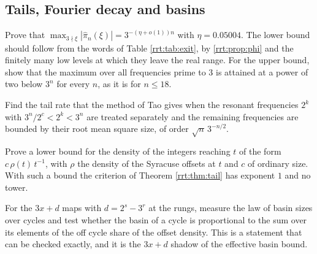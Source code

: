 \subsection{Tails, Fourier decay and basins}
\begin{problem*}[R11. B2 restated]\label{rrt:prob:r11}
Prove that $\max_{3\nmid\xi}|\widehat\pi_n(\xi)|=3^{-(\eta+o(1))n}$ with $\eta=0.05004$. The lower bound should follow from the words of Table \ref{rrt:tab:exit}, by \cref{rrt:prop:phi} and the finitely many low levels at which they leave the real range. For the upper bound, show that the maximum over all frequencies prime to $3$ is attained at a power of two below $3^n$ for every $n$, as it is for $n\le18$.
\end{problem*}

\begin{problem*}\label{rrt:prob:r12}
Find the tail rate that the method of Tao gives when the resonant frequencies $2^k$ with $3^n/2^{c}<2^k<3^n$ are treated separately and the remaining frequencies are bounded by their root mean square size, of order $\sqrt n\,3^{-n/2}$.
\end{problem*}


\begin{problem*}\label{rrt:prob:r13}
Prove a lower bound for the density of the integers reaching $t$ of the form $c\,\rho(t)\,t^{-1}$, with $\rho$ the density of the Syracuse offsets at $t$ and $c$ of ordinary size. With such a bound the criterion of Theorem \ref{rrt:thm:tail} has exponent $1$ and no tower.
\end{problem*}

\begin{problem*}\label{rrt:prob:r14}
For the $3x+d$ maps with $d=2^s-3^r$ at the rungs, measure the law of basin sizes over cycles and test whether the basin of a cycle is proportional to the sum over its elements of the off cycle share of the offset density. This is a statement that can be checked exactly, and it is the $3x+d$ shadow of the effective basin bound.
\end{problem*}


